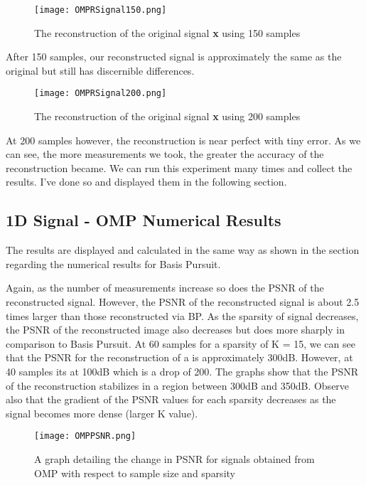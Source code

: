 \documentclass[titlepage,oneside, 12pt]{book}
\theoremstyle{break}
\begin{document}
\begin{figure}[H]
\centering
\centerline{\texttt{[image: OMPRSignal150.png]}}
\caption{The reconstruction of the original signal \textbf{x} using 150 samples}
\label{fig:OMPSig150R}
\end{figure}

After 150 samples, our reconstructed signal is approximately the same as the original but still has discernible differences. 

\begin{figure}[H]
\centering
\centerline{\texttt{[image: OMPRSignal200.png]}}
\caption{The reconstruction of the original signal \textbf{x} using 200 samples}
\label{fig:OMPSig200R}
\end{figure}

At 200 samples however, the reconstruction is near perfect with tiny error. 
As we can see, the more measurements we took, the greater the accuracy of the reconstruction became. We can run this experiment many times and collect the results. I've done so and displayed them in the following section.


\newpage
\subsection{1D Signal - OMP Numerical Results}

The results are displayed and calculated in the same way as shown in the section regarding the numerical results for Basis Pursuit. 

Again, as the number of measurements increase so does the PSNR of the reconstructed signal. However, the PSNR of the reconstructed signal is about 2.5 times larger than those reconstructed via BP. As the sparsity of signal decreases, the PSNR of the reconstructed image also decreases but does more sharply in comparison to Basis Pursuit. At 60 samples for a sparsity of K = 15, we can see that the PSNR for the reconstruction of a  is approximately 300dB. However, at 40 samples its at 100dB which is a drop of 200. The graphs show that the PSNR of the reconstruction stabilizes in a region between 300dB and 350dB. Observe also that the gradient of the PSNR values for each sparsity decreases as the signal becomes more dense (larger K value).


\begin{figure}[h]
\centering
\centerline{\texttt{[image: OMPPSNR.png]}}
\caption{A graph detailing the change in PSNR for signals obtained from OMP with respect to sample size and sparsity}
\label{fig:OMPSigSNR}
\end{figure}
\end{document}
